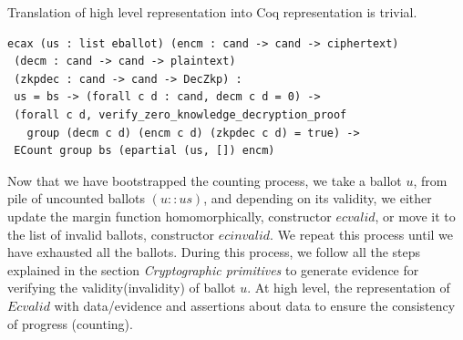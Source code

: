 \documentclass{llncs}
\begin{document}
%
Translation of high level representation into Coq representation is trivial.
\begin{lstlisting}[frame=single,basicstyle=\ttfamily\footnotesize]
ecax (us : list eballot) (encm : cand -> cand -> ciphertext)
 (decm : cand -> cand -> plaintext) 
 (zkpdec : cand -> cand -> DecZkp) :
 us = bs -> (forall c d : cand, decm c d = 0) -> 
 (forall c d, verify_zero_knowledge_decryption_proof 
   group (decm c d) (encm c d) (zkpdec c d) = true) -> 
 ECount group bs (epartial (us, []) encm)
\end{lstlisting}

Now that we have bootstrapped the counting process, we take a ballot 
$u$, from pile of uncounted ballots
$(u :: us)$, and depending  on its validity, 
we either update the margin function homomorphically, constructor $ecvalid$, 
or move it to the list of invalid ballots, constructor $ecinvalid$. We repeat
this process until we have exhausted all the ballots. During this process, 
we follow all the steps explained in the section 
\emph{Cryptographic primitives} to generate evidence 
for verifying the validity(invalidity) of ballot $u$. 
At high level, the representation of $Ecvalid$ with data/evidence 
and assertions about data to ensure the consistency of progress (counting).
\end{document}
